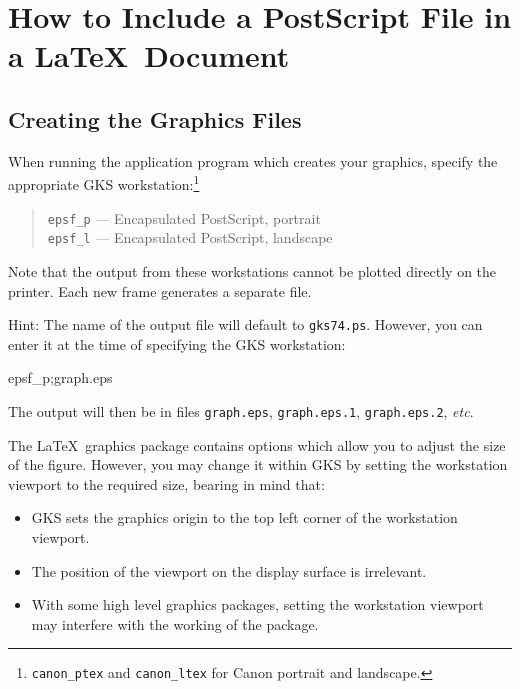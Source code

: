 \documentclass[11pt,twoside,nolof]{starlink}
\begin{document}
\section{\label{including_ps_in_latex}
How to Include a PostScript File in a \LaTeX\ Document}

\subsection{Creating the Graphics Files}

When running the application program which creates your graphics,
specify the appropriate GKS workstation:\footnote{\texttt{canon\_ptex} and
\texttt{canon\_ltex} for Canon portrait and landscape.}

\begin{quote}
  \texttt{epsf\_p} --- Encapsulated PostScript, portrait\\
  \texttt{epsf\_l} --- Encapsulated PostScript, landscape
\end{quote}

Note that the output from these workstations cannot be plotted directly on
the printer. Each new frame generates a separate file.

Hint: The name of the output file will default to \texttt{gks74.ps}.
However, you can enter it at the time of specifying the GKS workstation:

\begin{terminalv}
epsf_p;graph.eps
\end{terminalv}

The output will then be in files \texttt{graph.eps},
\texttt{graph.eps.1}, \texttt{graph.eps.2}, \emph{etc}.

The \LaTeX\ graphics package contains options which allow you to
adjust the size of the figure.
However, you may change it within GKS by setting the workstation viewport to
the required size, bearing in mind that:

\begin{itemize}
  \item GKS sets the graphics origin to the top left corner of the workstation
        viewport.
  \item The position of the viewport on the display surface is irrelevant.
  \item With some high level graphics packages, setting the workstation
        viewport may interfere with the working of the package.
\end{itemize}
\end{document}
